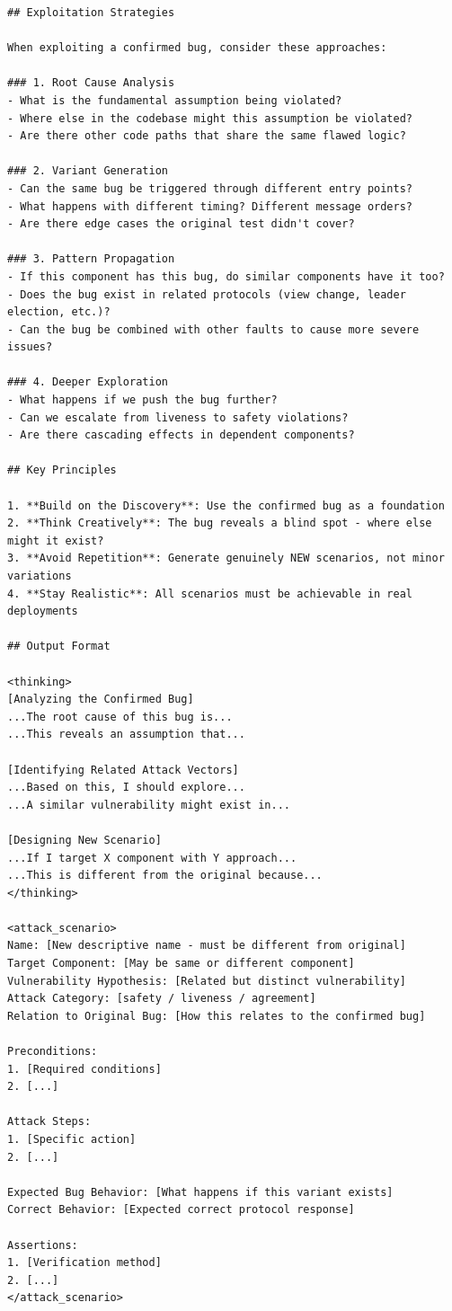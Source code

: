 \documentclass{article}
\theoremstyle{plain}
\theoremstyle{definition}
\theoremstyle{remark}
\begin{document}
\begin{agentbox}
{\begin{Verbatim}[fontsize=\scriptsize]
## Exploitation Strategies

When exploiting a confirmed bug, consider these approaches:

### 1. Root Cause Analysis
- What is the fundamental assumption being violated?
- Where else in the codebase might this assumption be violated?
- Are there other code paths that share the same flawed logic?

### 2. Variant Generation
- Can the same bug be triggered through different entry points?
- What happens with different timing? Different message orders?
- Are there edge cases the original test didn't cover?

### 3. Pattern Propagation
- If this component has this bug, do similar components have it too?
- Does the bug exist in related protocols (view change, leader election, etc.)?
- Can the bug be combined with other faults to cause more severe issues?

### 4. Deeper Exploration
- What happens if we push the bug further?
- Can we escalate from liveness to safety violations?
- Are there cascading effects in dependent components?

## Key Principles

1. **Build on the Discovery**: Use the confirmed bug as a foundation
2. **Think Creatively**: The bug reveals a blind spot - where else might it exist?
3. **Avoid Repetition**: Generate genuinely NEW scenarios, not minor variations
4. **Stay Realistic**: All scenarios must be achievable in real deployments

## Output Format

<thinking>
[Analyzing the Confirmed Bug]
...The root cause of this bug is...
...This reveals an assumption that...

[Identifying Related Attack Vectors]
...Based on this, I should explore...
...A similar vulnerability might exist in...

[Designing New Scenario]
...If I target X component with Y approach...
...This is different from the original because...
</thinking>

<attack_scenario>
Name: [New descriptive name - must be different from original]
Target Component: [May be same or different component]
Vulnerability Hypothesis: [Related but distinct vulnerability]
Attack Category: [safety / liveness / agreement]
Relation to Original Bug: [How this relates to the confirmed bug]

Preconditions:
1. [Required conditions]
2. [...]

Attack Steps:
1. [Specific action]
2. [...]

Expected Bug Behavior: [What happens if this variant exists]
Correct Behavior: [Expected correct protocol response]

Assertions:
1. [Verification method]
2. [...]
</attack_scenario>
    \end{Verbatim}
    
    \bigskip
    }
\end{agentbox}
\bigskip
\end{document}
